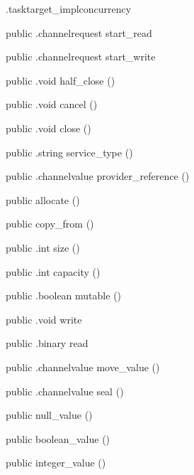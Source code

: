 \begin{CrexxClass}{.tasktarget\_impl}{concurrency}
\begin{Members}
    \Method
      {public}
      {.channelrequest}
      {start\_read}
      {}

    \Method
      {public}
      {.channelrequest}
      {start\_write}
      {}

    \Method
      {public}
      {.void}
      {half\_close}
      {()}

    \Method
      {public}
      {.void}
      {cancel}
      {()}

    \Method
      {public}
      {.void}
      {close}
      {()}

    \Method
      {public}
      {.string}
      {service\_type}
      {()}

    \Method
      {public}
      {.channelvalue}
      {provider\_reference}
      {()}

    \Factory
      {public}
      {allocate}
      {()}

    \Factory
      {public}
      {copy\_from}
      {()}

    \Method
      {public}
      {.int}
      {size}
      {()}

    \Method
      {public}
      {.int}
      {capacity}
      {()}

    \Method
      {public}
      {.boolean}
      {mutable}
      {()}

    \Method
      {public}
      {.void}
      {write}
      {}

    \Method
      {public}
      {.binary}
      {read}
      {}

    \Method
      {public}
      {.channelvalue}
      {move\_value}
      {()}

    \Method
      {public}
      {.channelvalue}
      {seal}
      {()}

    \Factory
      {public}
      {null\_value}
      {()}

    \Factory
      {public}
      {boolean\_value}
      {()}

    \Factory
      {public}
      {integer\_value}
      {()}


\end{Members}
\end{CrexxClass}

